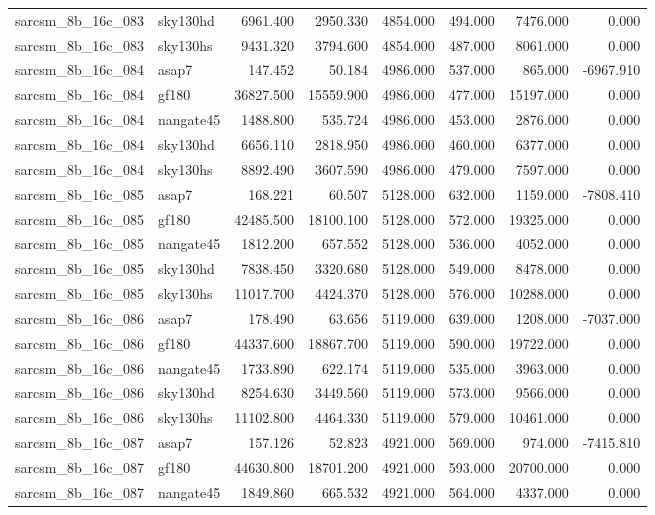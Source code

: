 \begin{tabular}{llrrrrrr}
sarcsm\_8b\_16c\_083 & sky130hd & 6961.400 & 2950.330 & 4854.000 & 494.000 & 7476.000 & 0.000 \\
sarcsm\_8b\_16c\_083 & sky130hs & 9431.320 & 3794.600 & 4854.000 & 487.000 & 8061.000 & 0.000 \\
sarcsm\_8b\_16c\_084 & asap7 & 147.452 & 50.184 & 4986.000 & 537.000 & 865.000 & -6967.910 \\
sarcsm\_8b\_16c\_084 & gf180 & 36827.500 & 15559.900 & 4986.000 & 477.000 & 15197.000 & 0.000 \\
sarcsm\_8b\_16c\_084 & nangate45 & 1488.800 & 535.724 & 4986.000 & 453.000 & 2876.000 & 0.000 \\
sarcsm\_8b\_16c\_084 & sky130hd & 6656.110 & 2818.950 & 4986.000 & 460.000 & 6377.000 & 0.000 \\
sarcsm\_8b\_16c\_084 & sky130hs & 8892.490 & 3607.590 & 4986.000 & 479.000 & 7597.000 & 0.000 \\
sarcsm\_8b\_16c\_085 & asap7 & 168.221 & 60.507 & 5128.000 & 632.000 & 1159.000 & -7808.410 \\
sarcsm\_8b\_16c\_085 & gf180 & 42485.500 & 18100.100 & 5128.000 & 572.000 & 19325.000 & 0.000 \\
sarcsm\_8b\_16c\_085 & nangate45 & 1812.200 & 657.552 & 5128.000 & 536.000 & 4052.000 & 0.000 \\
sarcsm\_8b\_16c\_085 & sky130hd & 7838.450 & 3320.680 & 5128.000 & 549.000 & 8478.000 & 0.000 \\
sarcsm\_8b\_16c\_085 & sky130hs & 11017.700 & 4424.370 & 5128.000 & 576.000 & 10288.000 & 0.000 \\
sarcsm\_8b\_16c\_086 & asap7 & 178.490 & 63.656 & 5119.000 & 639.000 & 1208.000 & -7037.000 \\
sarcsm\_8b\_16c\_086 & gf180 & 44337.600 & 18867.700 & 5119.000 & 590.000 & 19722.000 & 0.000 \\
sarcsm\_8b\_16c\_086 & nangate45 & 1733.890 & 622.174 & 5119.000 & 535.000 & 3963.000 & 0.000 \\
sarcsm\_8b\_16c\_086 & sky130hd & 8254.630 & 3449.560 & 5119.000 & 573.000 & 9566.000 & 0.000 \\
sarcsm\_8b\_16c\_086 & sky130hs & 11102.800 & 4464.330 & 5119.000 & 579.000 & 10461.000 & 0.000 \\
sarcsm\_8b\_16c\_087 & asap7 & 157.126 & 52.823 & 4921.000 & 569.000 & 974.000 & -7415.810 \\
sarcsm\_8b\_16c\_087 & gf180 & 44630.800 & 18701.200 & 4921.000 & 593.000 & 20700.000 & 0.000 \\
sarcsm\_8b\_16c\_087 & nangate45 & 1849.860 & 665.532 & 4921.000 & 564.000 & 4337.000 & 0.000 \\

\end{tabular}
